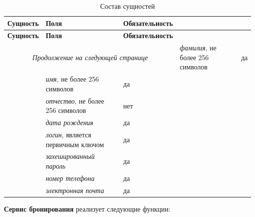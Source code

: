 \begin{longtable}{| p{3cm} | p{9.3cm} | p{3.6cm} |}
	\caption{Состав сущностей}
	\label{tbl:db_auth} \\
	\hline
	
	\textbf{Сущность} & \textbf{Поля} & \textbf{Обязательность} \\
	\hline
	\endfirsthead
	
	\hline
	\textbf{Сущность} & \textbf{Поля} & \textbf{Обязательность} \\
	\hline
	\endhead
	
	\hline
	\multicolumn{3}{c}{\textit{Продолжение на следующей странице}}
	\endfoot
	\hline
	\endlastfoot
	
	\multirow{1}{*}{Аккаунт}
	& 
	\textit{фамилия}, не более 256 символов
	& 
	да \\
	\cline{2-3}
	
	& 
	\textit{имя}, не более 256 символов
	& 
	да \\
	\cline{2-3}
	
	& 
	\textit{отчество}, не более 256 символов
	& 
	нет \\
	\cline{2-3}
	
	& 
	\textit{дата рождения}
	& 
	да \\
	\cline{2-3}
	
	& 
	\textit{логин}, является первичным ключом
	& 
	да \\
	\cline{2-3}
	
	&
	\textit{захешированный пароль}
	&
	да \\
	\cline{2-3}
	
	&
	\textit{номер телефона}
	&
	да \\
	\cline{2-3}
	
	&
	\textit{электронная почта}
	&
	да
\end{longtable}
\textbf{Сервис бронирования} реализует следующие функции:
